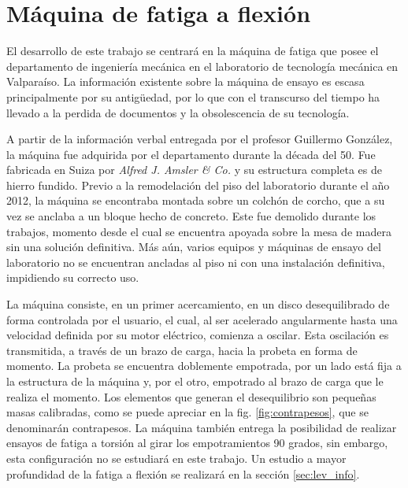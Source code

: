 \section{Máquina de fatiga a flexión}
El desarrollo de este trabajo se centrará en la máquina de fatiga que posee el departamento de ingeniería mecánica en el laboratorio de tecnología mecánica en Valparaíso. La información existente sobre la máquina de ensayo es escasa principalmente por su antigüedad, por lo que con el transcurso del tiempo ha llevado a la perdida de documentos y la obsolescencia de su tecnología.  

A partir de la información verbal entregada por el profesor Guillermo González, la máquina fue adquirida por el departamento durante la década del 50. Fue fabricada en Suiza por \textit{Alfred J. Amsler \& Co.} y su estructura completa es de hierro fundido. Previo a la remodelación del piso del laboratorio durante el año 2012, la máquina se encontraba montada sobre un colchón de corcho, que a su vez se anclaba a un bloque hecho de concreto. Este fue demolido durante los trabajos, momento desde el cual se encuentra apoyada sobre la mesa de madera sin una solución definitiva. Más aún, varios equipos y máquinas de ensayo del laboratorio no se encuentran ancladas al piso ni con una instalación definitiva, impidiendo su correcto uso.

La máquina consiste, en un primer acercamiento, en un disco desequilibrado de forma controlada por el usuario, el cual, al ser acelerado angularmente hasta una velocidad definida por su motor eléctrico, comienza a oscilar. Esta oscilación es transmitida, a través de un brazo de carga, hacia la probeta en forma de momento. La probeta se encuentra doblemente empotrada, por un lado está fija a la estructura de la máquina y, por el otro, empotrado al brazo de carga que le realiza el momento. Los elementos que generan el desequilibrio son pequeñas masas calibradas, como se puede apreciar en la fig. \ref{fig:contrapesos}, que se denominarán contrapesos. La máquina también entrega la posibilidad de realizar ensayos de fatiga a torsión al girar los empotramientos 90 grados, sin embargo, esta configuración no se estudiará en este trabajo. Un estudio a mayor profundidad de la fatiga a flexión se realizará en la sección \ref{sec:lev_info}.

